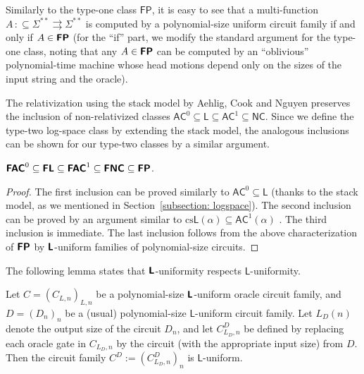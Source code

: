 \documentclass[envcountsect,envcountsame,orivec,oribibl]{llncs}
\newcommand{\classonefont}[1]{\mathsf{#1}}
\newcommand{\classL}{\classonefont{L}}
\newcommand{\classFP}{\classonefont{FP}}
\newcommand{\classNC}{\classonefont{NC}}
\newcommand{\classAC}{\classonefont{AC}}
\newcommand{\classtwofont}[1]{\text{\bfseries \sffamily \upshape #1}}
\newcommand{\classLtwo}{\classtwofont{L}}
\newcommand{\classFLtwo}{\classtwofont{FL}}
\newcommand{\classFNCtwo}{\classtwofont{FNC}}
\newcommand{\classFACtwo}{\classtwofont{FAC}}
\newcommand{\classFPtwo}{\classtwofont{FP}}
\newcommand{\LM}{\varSigma ^{**}}
\newcommand{\pcolon}{\mathpunct{\,:\subseteq}}
\begin{document}
Similarly to the type-one class $\classFP$, it is easy to see that
a multi-function $A \pcolon \LM \rightrightarrows \LM$ is computed by a polynomial-size
uniform circuit family if and only if $A \in \classFPtwo$
(for the ``if'' part, we modify the standard argument for the type-one class, 
noting that any $A \in \classFPtwo$ can be computed by 
an ``oblivious'' polynomial-time machine 
whose head motions depend only on the sizes of 
the input string and the oracle).

The relativization using the stack model by Aehlig, Cook and Nguyen preserves
the inclusion of non-relativized classes
$\classAC^0 \subseteq \classL \subseteq \classAC^1 \subseteq \classNC$.
Since we define the type-two log-space class by extending the stack model,
the analogous inclusions can be shown for our type-two classes
by a similar argument. 

\begin{theorem}
\label{theorem:inclusion}
$ \classFACtwo^0
 \subseteq \classFLtwo 
 \subseteq \classFACtwo^1
 \subseteq \classFNCtwo
 \subseteq \classFPtwo$. 
\end{theorem}

\begin{proof}
 The first inclusion can be proved similarly
 to $\classAC^0 \subseteq \classL$ (thanks to the stack model, as we mentioned 
 in Section~\ref{subsection: logspace}).
 The second inclusion can be proved by an argument similar to
 $\text{cs}\classL(\alpha) \subseteq \classAC^1(\alpha)$
 \cite{aehlig2007relativizing}.
 The third inclusion is immediate.
 The last inclusion follows from the above characterization of $\classFPtwo$
 by $\classLtwo$-uniform families of polynomial-size circuits.
\end{proof}

The following lemma states that $\classLtwo$-uniformity respects
$\classL$-uniformity.

\begin{lemma}
\label{lemma: respects uniformity}
 Let $C = (C _{L, n}) _{L, n}$ be a 
 polynomial-size $\classLtwo$-uniform oracle circuit family, 
 and $D = (D _n) _n$ be a (usual) polynomial-size $\classL$-uniform circuit family.
 Let $L _D (n)$ denote the output size of the circuit $D _n$, 
 and let $C _{L _D, n} ^D$ be 
 defined by replacing each oracle gate in $C _{L _D, n}$
 by the circuit (with the appropriate input size) from $D$. 
 Then the circuit family $C ^D := (C _{L _D, n} ^D) _n$ is $\classL$-uniform.
\end{lemma}
\end{document}
